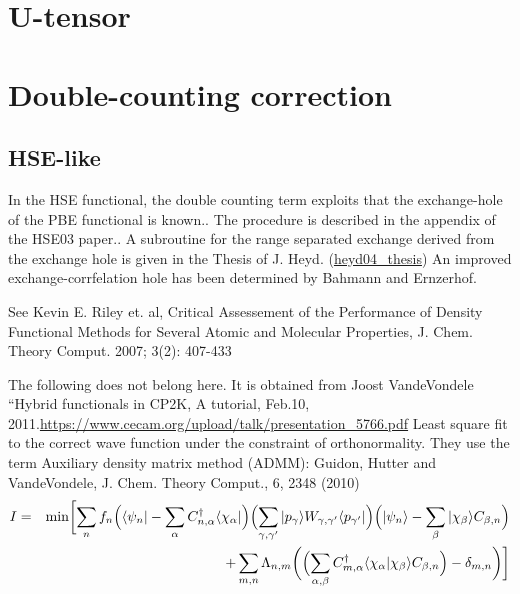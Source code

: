 \documentclass[11pt,a4paper]{report}
\begin{document}
\section{U-tensor}
\section{Double-counting correction}


\subsection{HSE-like}
In the HSE functional\cite{heyd03_jcp118_8207}, the double counting
term exploits that the exchange-hole of the PBE functional is
known.\cite{ernzerhof98_jcp109_3313}. The procedure is described in
the appendix of the HSE03 paper.\cite{heyd03_jcp118_8207}. A
subroutine for the range separated exchange derived from the exchange
hole is given in the Thesis of J. Heyd. (\url{heyd04_thesis}) An
improved exchange-corrfelation hole has been determined by Bahmann and
Ernzerhof\cite{bahmann08_jcp128_234104}.




See Kevin E. Riley et. al, Critical Assessement of the Performance of
Density Functional Methods for Several Atomic and Molecular
Properties, J. Chem. Theory Comput. 2007; 3(2): 407-433


The following does not belong here. It is obtained from Joost
VandeVondele ``Hybrid functionals in CP2K, A tutorial, Feb.10,
2011.\url{https://www.cecam.org/upload/talk/presentation_5766.pdf}
Least square fit to the correct wave function under the constraint of
orthonormality. They use the term Auxiliary density matrix method
(ADMM): Guidon, Hutter and VandeVondele, J. Chem. Theory Comput., 6,
2348 (2010)
\begin{eqnarray}
I&=&\min\biggl[
\sum_n f_n
\Bigl(\langle\psi_n|-\sum_\alpha C^\dagger_{n,\alpha}\langle\chi_\alpha|\Bigr)
\Bigl(\sum_{\gamma,\gamma'} |p_\gamma\rangle W_{\gamma,\gamma'}\langle p_{\gamma'}|\Bigr)
\Bigl(|\psi_n\rangle-\sum_\beta |\chi_\beta\rangle C_{\beta,n}\Bigr)
\nonumber\\
&&+\sum_{m,n}\Lambda_{n,m}\biggl(
\Bigl(\sum_{\alpha,\beta}
C^\dagger_{m,\alpha}\langle\chi_{\alpha}|\chi_\beta\rangle C_{\beta,n}
\Bigr)
-\delta_{m,n}\biggr)
\biggr]
\end{eqnarray}
\end{document}
